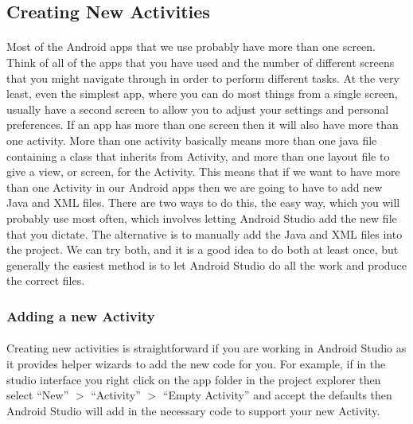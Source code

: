 \subsection{Creating New Activities}
\paragraph{} Most of the Android apps that we use probably have more than one screen. Think of all of the apps that you have used and the number of different screens that you might navigate through in order to perform different tasks. At the very least, even the simplest app, where you can do most things from a single screen, usually have a second screen to allow you to adjust your settings and personal preferences. If an app has more than one screen then it will also have more than one activity. More than one activity basically means more than one java file containing a class that inherits from Activity, and more than one layout file to give a view, or screen, for the Activity. This means that if we want to have more than one Activity in our Android apps then we are going to have to add new Java and XML files. There are two ways to do this, the easy way, which you will probably use most often, which involves letting Android Studio add the new file that you dictate. The alternative is to manually add the Java and XML files into the project. We can try both, and it is a good idea to do both at least once, but generally the easiest method is to let Android Studio do all the work and produce the correct files.

\subsubsection{Adding a new Activity}
\paragraph{} Creating new activities is straightforward if you are working in Android Studio as it provides helper wizards to add the new code for you. For example, if in the studio interface you right click on the app folder in the project explorer then select ``New'' $>$ ``Activity'' $>$ ``Empty Activity'' and accept the defaults then Android Studio will add in the necessary code to support your new Activity.

